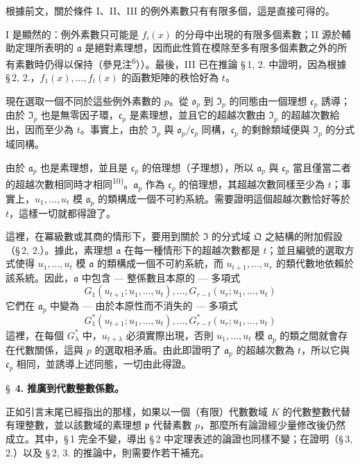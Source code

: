 \documentclass[11pt]{article}
\begin{document}
根據前文，關於條件 I、II、III 的例外素數只有有限多個，這是直接可得的。

I 是顯然的：例外素數只可能是 $f_i(x)$ 的分母中出現的有限多個素數；II 源於輔助定理所表明的 $\mathfrak{a}$ 是絕對素理想，因而此性質在模除至多有限多個素數之外的所有素數時仍得以保持（參見注\textsuperscript{6}））。最後，III 已在推論 \S\,1, 2. 中證明，因為根據 \S\,2, 2.，$f_1(x),\ldots,f_t(x)$ 的函數矩陣的秩恰好為 $t$。

現在選取一個不同於這些例外素數的 $p$。從 $\mathfrak{o}_p$ 到 $\mathfrak{I}_p$ 的同態由一個理想 $\mathfrak{c}_p$ 誘導；由於 $\mathfrak{I}_p$ 也是無零因子環，$\mathfrak{c}_p$ 是素理想，並且它的超越次數由 $\mathfrak{I}_p$ 的超越次數給出，因而至少為 $t$。事實上，由於 $\mathfrak{I}_p$ 與 $\mathfrak{o}_p/\mathfrak{c}_p$ 同構，$\mathfrak{c}_p$ 的剩餘類域便與 $\mathfrak{I}_p$ 的分式域同構。

由於 $\mathfrak{a}_p$ 也是素理想，並且是 $\mathfrak{c}_p$ 的倍理想（子理想），所以 $\mathfrak{a}_p$ 與 $\mathfrak{c}_p$ 當且僅當二者的超越次數相同時才相同\textsuperscript{10)}。$\mathfrak{a}_p$ 作為 $\mathfrak{c}_p$ 的倍理想，其超越次數同樣至少為 $t$；事實上，$u_1,\ldots,u_t$ 模 $\mathfrak{a}_p$ 的類構成一個不可約系統。需要證明這個超越次數恰好等於 $t$，這樣一切就都得證了。

這裡，在冪級數或其商的情形下，要用到關於 $\mathfrak{I}$ 的分式域 $\mathfrak{Q}$ 之結構的附加假設（\S\,2, 2.）。據此，素理想 $\mathfrak{a}$ 在每一種情形下的超越次數都是 $t$；並且編號的選取方式使得 $u_1,\ldots,u_t$ 模 $\mathfrak{a}$ 的類構成一個不可約系統，而 $u_{t+1},\ldots,u_r$ 的類代數地依賴於該系統。因此，$\mathfrak{a}$ 中包含 --- 整係數且本原的 --- 多項式
\[
G_1(u_{t+1};u_1,\ldots,u_t),\ldots,G_{r-t}(u_r;u_1,\ldots,u_t)\tag{1}
\]
它們在 $\mathfrak{a}_p$ 中變為 --- 由於本原性而不消失的 --- 多項式
\[
G^*_1(u_{t+1};u_1,\ldots,u_t),\ldots,G^*_{r-t}(u_r;u_1,\ldots,u_t)\tag{2}
\]
這裡，在每個 $G^*_\lambda$ 中，$u_{t+\lambda}$ 必須實際出現，否則 $u_1,\ldots,u_t$ 模 $\mathfrak{a}_p$ 的類之間就會存在代數關係，這與 $p$ 的選取相矛盾。由此即證明了 $\mathfrak{a}_p$ 的超越次數為 $t$，所以它與 $\mathfrak{c}_p$ 相同，並誘導上述同態，一切由此得證。

\bigskip
\S~\textbf{4.}
\textbf{推廣到代數整數係數。}

\smallskip

\noindent
正如引言末尾已經指出的那樣，如果以一個（有限）代數數域 $K$ 的代數整數代替有理整數，並以該數域的素理想 $\mathfrak{p}$ 代替素數 $p$，那麼所有論證經少量修改後仍然成立。其中，\S\,1 完全不變，導出 \S\,2 中定理表述的論證也同樣不變；在證明（\S\,3, 2.）以及 \S\,2, 3. 的推論中，則需要作若干補充。
\end{document}
